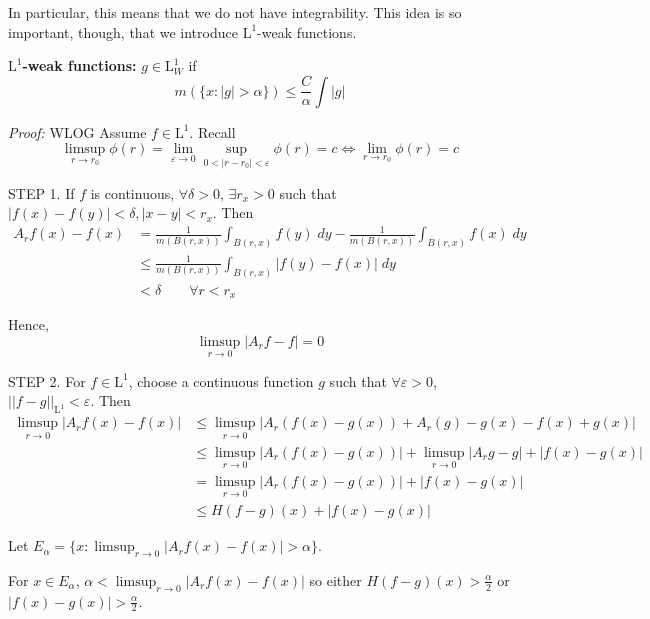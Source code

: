 \documentclass[12pt]{report}
\newcommand{\R}{\mathbb{R}}
\newcommand{\abs}[1]{\left\vert #1 \right\vert}
\newcommand{\norm}[1]{\left\vert\left\vert #1 \right\vert\right\vert}
\newcommand{\ep}{\varepsilon}
\renewcommand{\L}{\text{L}}
\newcommand*{\tbf}[1]{\ifmmode\mathbf{#1}\else\textbf{#1}\fi}
\newenvironment*{tbox}[2][gray]{
    \begin{tcolorbox}[
        parbox=false,
        colback=#1!5!white,
        colframe=#1!75!black,
        breakable,
        title={#2}
    ]}
    {\end{tcolorbox}}
\begin{document}
        In particular, this means that we do not have integrability. This idea is so important, though, that we introduce $\L^1$-weak functions. 
        
        \tbf{$\L^1$-weak functions:} $g \in \L^1_W$ if 
        \[m(\{x: \abs{g} > \alpha\}) \leq \frac{C}{\alpha} \int \abs{g}\]
    
        \begin{tbox}{\textbf{Theorem:} If $f \in \L^1_{\text{loc}}$< then $\lim_{r \to 0} A_r f(x) = f(x)$ a.e. for $x \in \R^n$} 
            \emph{Proof:} WLOG Assume $f \in \L^1$. Recall 
            \[\limsup_{r \to r_0} \phi(r) = \lim_{\ep \to 0} \sup_{0 < \abs{r - r_0} < \ep} \phi(r) = c \iff \lim_{r \to r_0} \phi(r) =c\] 

            STEP 1. If $f$ is continuous, $\forall \delta > 0$, $\exists r_x > 0$ such that $\abs{f(x) - f(y)} < \delta, \abs{x - y} < r_x$. Then
            \begin{align*}
                A_r f(x) - f(x) &= \frac{1}{m(B(r, x))} \int_{B(r, x)} f(y)\;dy - \frac{1}{m(B(r, x))} \int_{B(r, x)} f(x)\;dy\\ 
                    &\leq \frac{1}{m(B(r, x))} \int_{B(r, x)} \abs{f(y) - f(x)}\; dy\\ 
                    &< \delta \qquad \forall r < r_x
            \end{align*}

            Hence, 
            \[\limsup_{r \to 0} \abs{A_r f - f} = 0\]

            STEP 2. For $f \in \L^1$, choose a continuous function $g$ such that $\forall \ep > 0$, $\norm{f - g}_{\L^1} < \ep$. Then 
            \begin{align*}
                \limsup_{r \to 0} \abs{A_r f(x) - f(x)} &\leq \limsup_{r \to 0} \abs{A_r(f(x) - g(x)) + A_r(g) - g(x) - f(x) + g(x)}\\ 
                &\leq \limsup_{r \to 0} \abs{A_r (f(x) - g(x))} + \limsup_{r \to 0} \abs{A_r g - g} + \abs{f(x) - g(x)}\\ 
                &= \limsup_{r \to 0} \abs{A_r (f(x) - g(x))} + \abs{f(x) - g(x)}\\ 
                &\leq  H(f - g)(x) + \abs{f(x) - g(x)}
            \end{align*}

            Let $E_{\alpha} = \{x: \limsup_{r \to 0} \abs{A_r f(x) - f(x)} > \alpha\}$. 

            For $x \in E_{\alpha}$, $\alpha < \limsup_{r \to 0} \abs{A_r f(x) - f(x)}$ so either $H(f - g)(x) > \frac{\alpha}{2}$ or $\abs{f(x) - g(x)} > \frac{\alpha}{2}$.


\end{tbox}
\end{document}
